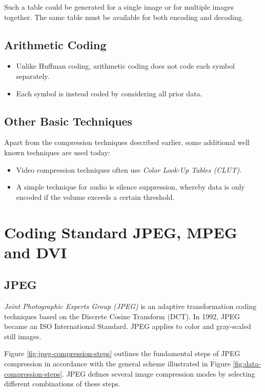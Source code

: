 Such a table could be generated for a single image or for multiple images together. The same table must be available for both encoding and decoding. 

\subsection{Arithmetic Coding}

\begin{itemize}
 \item Unlike Huffman coding, arithmetic coding does not code each symbol separately.
 \item Each symbol is instead coded by considering all prior data.
\end{itemize}

\subsection{Other Basic Techniques}
Apart from the compression techniques described earlier, some additional well
known techniques are used today:

\begin{itemize}
	\item Video compression techniques often use \textit{Color Look-Up Tables (CLUT)}.
	\item A simple technique for audio is silence suppression, whereby data is only encoded
	if the volume exceeds a certain threshold.
\end{itemize}

\section{Coding Standard JPEG, MPEG and DVI}

\subsection{JPEG}
\textit{Joint Photographic Experts Group (JPEG)} is an adaptive transformation coding techniques based on the Discrete Cosine Transform (DCT). In 1992, JPEG became an ISO International Standard. JPEG applies to color and gray-scaled still images.

Figure {\ref{fig:jpeg-compression-steps}} outlines the fundamental steps of JPEG compression in accordance with the general scheme illustrated in Figure {\ref{fig:data-compression-steps}}. JPEG defines several image compression modes by selecting different combinations of these steps.

